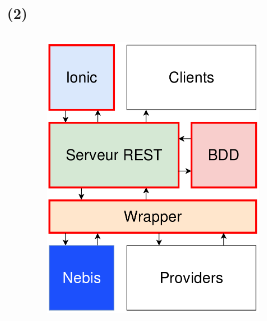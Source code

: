 \documentclass[10pt]{beamer}
\begin{document}
\begin{frame}
	\frametitle{\secname}
	\framesubtitle{\subsecname (2)}
	\begin{figure}
		\begin{center}
			\includegraphics[width=0.5\textwidth]{images/architecture2.png}
		\end{center}
	\end{figure}
\end{frame}
\end{document}
